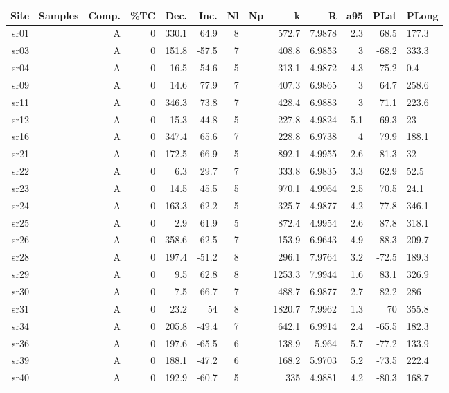 \begin{table}
\begin{tabular}{rrrrrrrrrrrr}
\hline
Site & Samples & Comp. & \%TC & Dec. & Inc. & Nl & Np & k & R & a95 & PLat & PLong \\
\hline
sr01 &  & A & 0 & 330.1 & 64.9 & 8 & & 572.7 & 7.9878 & 2.3 & 68.5 & 177.3\\
sr03 &  & A & 0 & 151.8 & -57.5 & 7 & & 408.8 & 6.9853 & 3 & -68.2 & 333.3\\
sr04 &  & A & 0 & 16.5 & 54.6 & 5 & & 313.1 & 4.9872 & 4.3 & 75.2 & 0.4\\
sr09 &  & A & 0 & 14.6 & 77.9 & 7 & & 407.3 & 6.9865 & 3 & 64.7 & 258.6\\
sr11 &  & A & 0 & 346.3 & 73.8 & 7 & & 428.4 & 6.9883 & 3 & 71.1 & 223.6\\
sr12 &  & A & 0 & 15.3 & 44.8 & 5 & & 227.8 & 4.9824 & 5.1 & 69.3 & 23\\
sr16 &  & A & 0 & 347.4 & 65.6 & 7 & & 228.8 & 6.9738 & 4 & 79.9 & 188.1\\
sr21 &  & A & 0 & 172.5 & -66.9 & 5 & & 892.1 & 4.9955 & 2.6 & -81.3 & 32\\
sr22 &  & A & 0 & 6.3 & 29.7 & 7 & & 333.8 & 6.9835 & 3.3 & 62.9 & 52.5\\
sr23 &  & A & 0 & 14.5 & 45.5 & 5 & & 970.1 & 4.9964 & 2.5 & 70.5 & 24.1\\
sr24 &  & A & 0 & 163.3 & -62.2 & 5 & & 325.7 & 4.9877 & 4.2 & -77.8 & 346.1\\
sr25 &  & A & 0 & 2.9 & 61.9 & 5 & & 872.4 & 4.9954 & 2.6 & 87.8 & 318.1\\
sr26 &  & A & 0 & 358.6 & 62.5 & 7 & & 153.9 & 6.9643 & 4.9 & 88.3 & 209.7\\
sr28 &  & A & 0 & 197.4 & -51.2 & 8 & & 296.1 & 7.9764 & 3.2 & -72.5 & 189.3\\
sr29 &  & A & 0 & 9.5 & 62.8 & 8 & & 1253.3 & 7.9944 & 1.6 & 83.1 & 326.9\\
sr30 &  & A & 0 & 7.5 & 66.7 & 7 & & 488.7 & 6.9877 & 2.7 & 82.2 & 286\\
sr31 &  & A & 0 & 23.2 & 54 & 8 & & 1820.7 & 7.9962 & 1.3 & 70 & 355.8\\
sr34 &  & A & 0 & 205.8 & -49.4 & 7 & & 642.1 & 6.9914 & 2.4 & -65.5 & 182.3\\
sr36 &  & A & 0 & 197.6 & -65.5 & 6 & & 138.9 & 5.964 & 5.7 & -77.2 & 133.9\\
sr39 &  & A & 0 & 188.1 & -47.2 & 6 & & 168.2 & 5.9703 & 5.2 & -73.5 & 222.4\\
sr40 &  & A & 0 & 192.9 & -60.7 & 5 & & 335 & 4.9881 & 4.2 & -80.3 & 168.7\\
\hline
\end{tabular}
\end{table}
